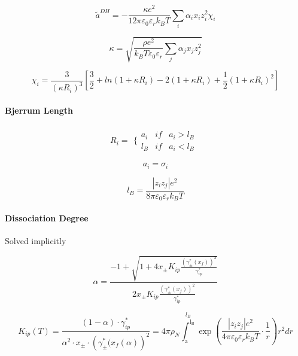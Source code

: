 \documentclass[12pt, letterpaper]{article}
\begin{document}
\begin{equation}
\tilde{a}^{DH}=-\frac{\kappa e^{2}}{12\pi\varepsilon_{0}\varepsilon_{r}k_{B}T}\sum_{i}\alpha_{i}x_{i}z_{i}^{2}\chi_{i}
\end{equation}

\begin{equation}
\kappa=\sqrt{\frac{\rho e^{2}}{k_{B}T\varepsilon_{0}\varepsilon_{r}}\sum_{j}\alpha_{j}x_{j}z_{j}^{2}}
\end{equation}

\begin{equation}
\chi_i=\frac{3}{\left(\kappa R_i\right)^3}\left[\frac{3}{2}+ln(1+\kappa R_i)-2(1+\kappa R_i)+\frac{1}{2}\left(1+\kappa R_i\right)^2\right]
\end{equation}

\paragraph{Bjerrum Length}

\begin{equation}
R_i=\begin{array}{c}\{\begin{array}{ccc}a_i&if&a_i>l_B\\l_B&if&a_i<l_B\end{array}\end{array}
\end{equation}

\begin{equation}
a_i=\sigma _i
\end{equation}

\begin{equation}
l_B=\frac{\left|z_iz_j\right|e^2}{8\pi\varepsilon_0\varepsilon_rk_BT}
\end{equation}

\paragraph{Dissociation Degree}

Solved implicitly

\begin{equation}
\alpha=\frac{-1+\sqrt{1+4x_\pm K_{ip}\frac{\left(\gamma_\pm^*\left(x_f\right)\right)^2}{\gamma_{ip}^*}}}{2x_\pm K_{ip}\frac{\left(\gamma_\pm^*\left(x_f\right)\right)^2}{\gamma_{ip}^*}}
\end{equation}

\begin{equation}
K_{ip}(T)=\frac{(1-\alpha)\cdot\gamma_{ip}^{*}}{\alpha^{2}\cdot x_{\pm}\cdot\left(\gamma_{\pm}^{*}(x_{f}(\alpha)\right)^{2}} = 4\pi\rho_N\overset{l_B}{\operatorname*{\int_a^{l_B}}}\exp\left(\frac{\left|z_iz_j\right|e^2}{4\pi\varepsilon_0\varepsilon_rk_BT}\cdot\frac{1}{r}\right)r^2dr
\end{equation}
\end{document}
